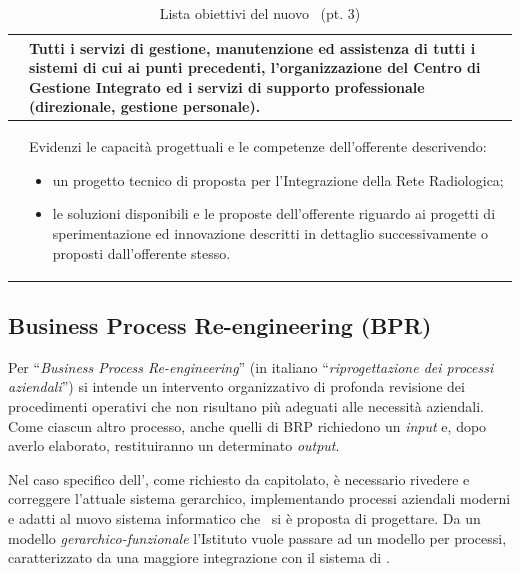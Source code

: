 \begin{table}[H]
\begin{tabular}{|>{\raggedright\arraybackslash}m{2cm}|m{10cm}|}
			\codiceobiettivo & Tutti i servizi di gestione, manutenzione ed assistenza di tutti i sistemi di cui ai punti precedenti, l’organizzazione del Centro di Gestione Integrato ed i servizi di supporto professionale (direzionale, gestione personale).
			\\\hline
			
			\codiceobiettivo & Evidenzi le capacità progettuali e le competenze dell’offerente descrivendo:
			\begin{itemize}[noitemsep]
				\item un progetto tecnico di proposta per l’Integrazione della Rete Radiologica;
				\item le soluzioni disponibili e le proposte dell’offerente riguardo ai progetti di sperimentazione ed innovazione descritti in dettaglio successivamente o proposti dall’offerente stesso.
			\end{itemize}
			\\\hline
	
		\end{tabular}
		\renewcommand\arraystretch{1}
		\caption{Lista obiettivi del nuovo \helpdesk~(pt. 3)}
	\end{table}	

	\newpage
	\subsection{Business Process Re-engineering (BPR)}\label{sec:desc_bpr}
		
		Per ``\textit{Business Process Re-engineering}'' (in italiano ``\textit{riprogettazione dei processi aziendali}'') si intende un intervento organizzativo di profonda revisione dei procedimenti operativi che non risultano più adeguati alle necessità aziendali.
		Come ciascun altro processo, anche quelli di BRP richiedono un \textit{input} e, dopo averlo elaborato, restituiranno un determinato \textit{output}.
		
		Nel caso specifico dell'\istituto, come richiesto da capitolato, è necessario rivedere e correggere l'attuale sistema gerarchico, implementando processi aziendali moderni e adatti al nuovo sistema informatico che \azienda~si è proposta di progettare.
		Da un modello \textit{gerarchico-funzionale} l'Istituto vuole passare ad un modello per processi, caratterizzato da una maggiore integrazione con il sistema di \helpdesk.
	
